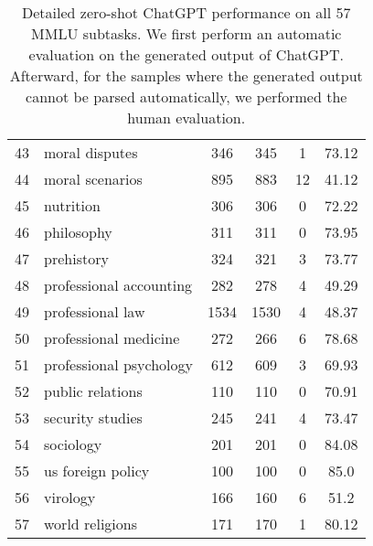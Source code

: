 \documentclass[11pt]{article}
\begin{document}
\begin{table*}
{\begin{tabular}{llcccc}
43 & moral disputes & 346 & 345 & 1 & 73.12\\
44 & moral scenarios & 895 & 883 & 12 & 41.12\\
45 & nutrition & 306 & 306 & 0 & 72.22\\
46 & philosophy & 311 & 311 & 0 & 73.95\\
47 & prehistory & 324 & 321 & 3 & 73.77\\
48 & professional accounting & 282 & 278 & 4 & 49.29\\
49 & professional law & 1534 & 1530 & 4 & 48.37\\
50 & professional medicine & 272 & 266 & 6 & 78.68\\
51 & professional psychology & 612 & 609 & 3 & 69.93\\
52 & public relations & 110 & 110 & 0 & 70.91\\
53 & security studies & 245 & 241 & 4 & 73.47\\
54 & sociology & 201 & 201 & 0 & 84.08\\
55 & us foreign policy & 100 & 100 & 0 & 85.0\\
56 & virology & 166 & 160 & 6 & 51.2\\
57 & world religions & 171 & 170 & 1 & 80.12\\
\bottomrule
\end{tabular}
}
\caption{Detailed zero-shot ChatGPT performance on all 57 MMLU subtasks. We first perform an automatic evaluation on the generated output of ChatGPT. Afterward, for the samples where the generated output cannot be parsed automatically, we performed the human evaluation. }
\label{tab:mmlu_detailed}
\end{table*} 
\end{document}
